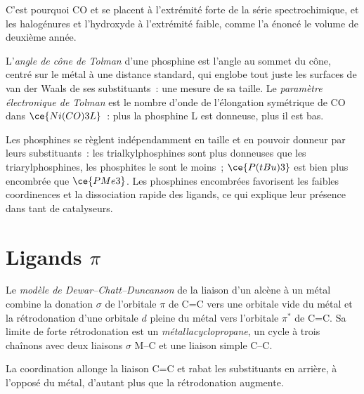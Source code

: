 C'est pourquoi CO et  se placent à l'extrémité forte de la série
spectrochimique, et les halogénures et l'hydroxyde à l'extrémité faible,
comme l'a énoncé le volume de deuxième année.

\begin{definition}\label{def:b3:organometallic-bonding:tolman}
L'\emph{angle de cône de Tolman} d'une phosphine est l'angle au
sommet du cône, centré sur le métal à une distance standard, qui englobe
tout juste les surfaces de van der Waals de ses substituants~: une mesure de
sa taille. Le \emph{paramètre électronique de Tolman} est le
nombre d'onde de l'élongation symétrique de CO dans $\ce{Ni(CO)3L}$~: plus la
phosphine L est donneuse, plus il est bas.
\end{definition}

Les phosphines se règlent indépendamment en taille et en pouvoir donneur
par leurs substituants~: les trialkylphosphines sont plus donneuses que les
triarylphosphines, les phosphites le sont le moins~; $\ce{P(tBu)3}$ est bien plus encombrée que $\ce{PMe3}$. Les phosphines
encombrées favorisent les faibles coordinences et la dissociation rapide
des ligands, ce qui explique leur présence dans tant de catalyseurs.

\section{Ligands $\pi$}

\begin{definition}\label{def:b3:organometallic-bonding:dcd}
Le \emph{modèle de Dewar--Chatt--Duncanson} de la
liaison d'un alcène à un métal combine la donation $\sigma$ de l'orbitale $\pi$ de C=C
vers une orbitale vide du métal et la rétrodonation d'une orbitale $d$
pleine du métal vers l'orbitale $\pi^*$ de C=C. Sa limite de forte
rétrodonation est un \emph{métallacyclopropane}, un cycle à
trois chaînons avec deux liaisons $\sigma$ M--C et une liaison simple C--C.
\end{definition}

\begin{proposition}\label{prop:b3:organometallic-bonding:dcd}
La coordination allonge la liaison C=C et rabat les substituants en arrière,
à l'opposé du métal, d'autant plus que la rétrodonation augmente.
\end{proposition}

